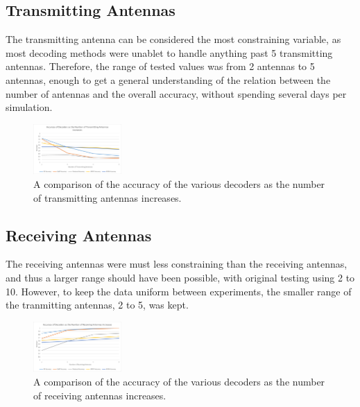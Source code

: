 \documentclass[conference]{IEEEtran}
\begin{document}
\subsection{Transmitting Antennas}
The transmitting antenna can be considered the most constraining variable, as most decoding methods were unablet to handle anything past 5 transmitting antennas. Therefore, the range of tested values was from 2 antennas to 5 antennas, enough to get a general understanding of the relation between the number of antennas and the overall accuracy, without spending several days per simulation.
\begin{figure}[h!]
    \centering
    \includegraphics[width=0.30\textwidth]{NtGraph.png}
    \caption{A comparison of the accuracy of the various decoders as the number of transmitting antennas increases.}
    \label{fig:NtGraph}
\end{figure}

\subsection{Receiving Antennas}
The receiving antennas were must less constraining than the receiving antennas, and thus a larger range should have been possible, with original testing using 2 to 10. However, to keep the data uniform between experiments, the smaller range of the tranmitting antennas, 2 to 5, was kept.
\begin{figure}[h!]
    \centering
    \includegraphics[width=0.30\textwidth]{NrGraph.png}
    \caption{A comparison of the accuracy of the various decoders as the number of receiving antennas increases.}
    \label{fig:NrGraph}
\end{figure}
\end{document}
